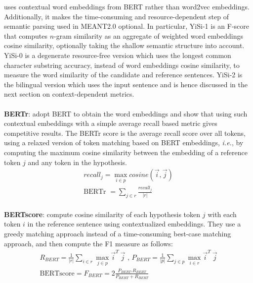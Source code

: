 uses contextual word embeddings from BERT rather than word2vec embeddings. 
Additionally, it makes the time-consuming and resource-dependent step of semantic parsing used in MEANT2.0 optional. In particular,  YiSi-1 is an F-score that computes $n$-gram similarity as an aggregate of weighted word embeddings cosine similarity, optionally taking the shallow semantic structure into account.  YiSi-0 is a degenerate resource-free version which uses the longest common character substring accuracy, instead of word embeddings cosine similarity, to measure the word similarity of the candidate and reference sentences. YiSi-2 is the bilingual version which uses the input sentence and is hence discussed in the next section on context-dependent metrics.\\ 
\\
\textbf{BERTr}:  adopt BERT to obtain the word embeddings and show that using such contextual embeddings with a simple average recall based metric gives competitive results.
The BERTr score is the average recall score over all tokens, using a relaxed version of token matching based on BERT embeddings, \textit{i.e.}, by computing the maximum cosine similarity between the embedding of a reference token $j$ and any token in the hypothesis.
\begin{gather*}
    recall_j = \max_{i\in p} cosine(\overrightarrow{i},\overrightarrow{j})
    \\
     \text{BERTr } = \sum_{j\in r}\frac{recall_j}{|r|}
\end{gather*}
\\
\textbf{BERTscore}:  compute cosine similarity of each hypothesis token $j$ with each token $i$ in the reference sentence using contextualized embeddings. They use a greedy matching approach instead of a time-consuming best-case matching approach, and then compute the F1 measure as follows:
\begin{gather*}
    R_{BERT} = \frac{1}{|r|}\sum_{i \in r} \max_{j \in p} \overrightarrow{i}^T\ \overrightarrow{j} \text{ , } P_{BERT} = \frac{1}{|p|}\sum_{j \in p} \max_{i \in r} \overrightarrow{i}^T\ \overrightarrow{j}
    \\
    \text{BERTscore} = F_{BERT} = 2 \frac{P_{BERT}.R_{BERT}}{P_{BERT}+ R_{BERT}}
\end{gather*}
